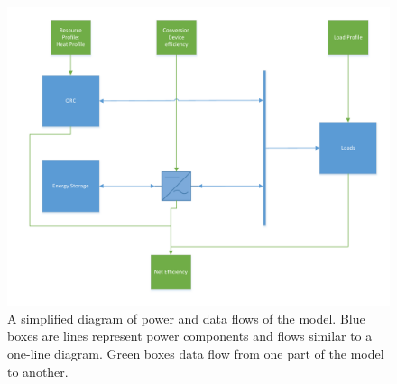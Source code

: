 \begin{figure}[h]
\label{fig:abridged_flow_diagram}
\centering
\includegraphics[width=\textwidth]{figures/Abridged Pilgrim Model Flow diagram - AC bus.pdf}
\caption{A simplified diagram of power and data flows of the model. Blue boxes are lines represent power components and flows similar to a one-line diagram. Green boxes data flow from one part of the model to another.}
\end{figure}